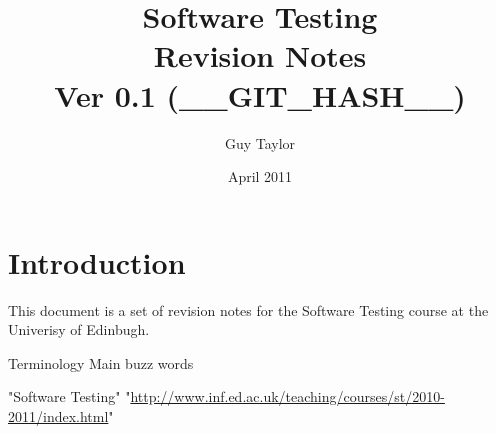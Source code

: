 \documentclass[11pt,twoside,a4paper]{article}
\begin{document}
  
  \title{
    Software Testing \\
    Revision Notes \\
    Ver 0.1 (\_\_GIT_HASH\_\_)
  }
  \author{Guy Taylor}
  \date{April 2011}
  
  \maketitle
  
  \tableofcontents
  
  \section{Introduction}
    This document is a set of revision notes for the Software Testing \cite{st_home} course at the Univerisy of Edinbugh.
  
  \clearpage
  
  \begin{section}{Terminology}
    Main buzz words
  \end{section}
  
  \clearpage
  
  \begin{thebibliography}{9}
      "Software Testing" "\url{http://www.inf.ed.ac.uk/teaching/courses/st/2010-2011/index.html}"
  \end{thebibliography}
\end{document}
